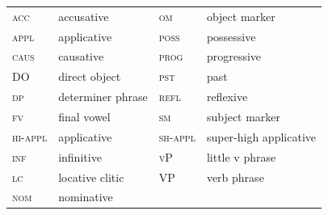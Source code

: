 \documentclass[output=paper,modfonts,nonflat]{langsci/langscibook}
\begin{document}
\begin{tabularx}{\textwidth}{lXlX}
\textsc{acc} &  accusative & \textsc{om} &  object marker\\
\textsc{appl} &  applicative & \textsc{poss} &  possessive\\
\textsc{caus} &  causative & \textsc{prog} &  progressive\\
DO\textsc{} &  direct object & \textsc{pst} &  past\\
\textsc{dp} &  determiner phrase & \textsc{refl} &  reflexive\\
\textsc{fv} &  final vowel & \textsc{sm} &  subject marker\\
\textsc{hi-appl} &  applicative & \textsc{sh-appl} &  super-high applicative\\
\textsc{inf} &  infinitive & \textsc{vP} &  little v phrase\\
\textsc{lc} &  locative clitic & \textsc{VP} &  verb phrase\\
\textsc{nom} &  nominative & \\ 
\end{tabularx}


\sloppy\printbibliography[heading=subbibliography,notkeyword=this]
\end{document}
